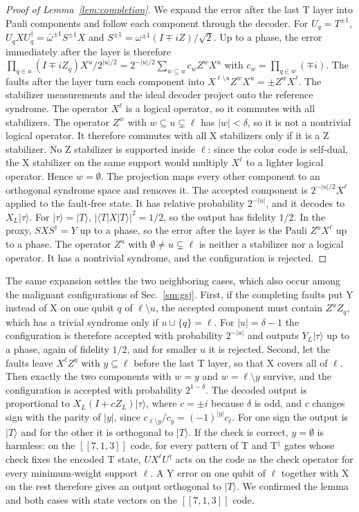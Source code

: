 \documentclass[aps,prl,reprint,twocolumn,amsmath,amssymb,floatfix,nofootinbib,superscriptaddress]{revtex4-2}
\theoremstyle{definition}
\theoremstyle{remark}
\begin{document}
\begin{proof}[Proof of Lemma~\ref{lem:completion}]
We expand the error after the last T layer into Pauli components and follow each component through the decoder. For $U_q=T^{\pm1}$, $U_qXU_q^\dagger=\bar\omega^{\pm1}S^{\pm1}X$ and $S^{\pm1}=\omega^{\pm1}(I\mp iZ)/\sqrt2$. Up to a phase, the error immediately after the layer is therefore $\prod_{q\in u}(I\mp iZ_q)X^u/2^{|u|/2}=2^{-|u|/2}\sum_{w\subseteq u}c_wZ^wX^u$ with $c_w=\prod_{q\in w}(\mp i)$. The faults after the layer turn each component into $X^{\ell\setminus u}Z^wX^u=\pm Z^wX^\ell$. The stabilizer measurements and the ideal decoder project onto the reference syndrome. The operator $X^\ell$ is a logical operator, so it commutes with all stabilizers. The operator $Z^w$ with $w\subseteq u\subsetneq\ell$ has $|w|<\delta$, so it is not a nontrivial logical operator. It therefore commutes with all X stabilizers only if it is a Z stabilizer. No Z stabilizer is supported inside $\ell$: since the color code is self-dual, the X stabilizer on the same support would multiply $X^\ell$ to a lighter logical operator. Hence $w=\emptyset$. The projection maps every other component to an orthogonal syndrome space and removes it. The accepted component is $2^{-|u|/2}X^\ell$ applied to the fault-free state. It has relative probability $2^{-|u|}$, and it decodes to $X_L|\tau\rangle$. For $|\tau\rangle=|T\rangle$, $|\langle T|X|T\rangle|^2=1/2$, so the output has fidelity $1/2$. In the proxy, $SXS^\dagger=Y$ up to a phase, so the error after the layer is the Pauli $Z^uX^\ell$ up to a phase. The operator $Z^u$ with $\emptyset\neq u\subsetneq\ell$ is neither a stabilizer nor a logical operator. It has a nontrivial syndrome, and the configuration is rejected.
\end{proof}
The same expansion settles the two neighboring cases, which also occur among the malignant configurations of Sec.~\ref{sm:gsj}. First, if the completing faults put Y instead of X on one qubit $q$ of $\ell\setminus u$, the accepted component must contain $Z^{u}Z_q$, which has a trivial syndrome only if $u\cup\{q\}=\ell$. For $|u|=\delta-1$ the configuration is therefore accepted with probability $2^{-|u|}$ and outputs $Y_L|\tau\rangle$ up to a phase, again of fidelity $1/2$, and for smaller $u$ it is rejected. Second, let the faults leave $X^\ell Z^y$ with $y\subseteq\ell$ before the last T layer, so that X covers all of $\ell$. Then exactly the two components with $w=y$ and $w=\ell\setminus y$ survive, and the configuration is accepted with probability $2^{1-\delta}$. The decoded output is proportional to $X_L(I+cZ_L)|\tau\rangle$, where $c=\pm i$ because $\delta$ is odd, and $c$ changes sign with the parity of $|y|$, since $c_{\ell\setminus y}/c_y=(-1)^{|y|}c_\ell$. For one sign the output is $|T\rangle$ and for the other it is orthogonal to $|T\rangle$. If the check is correct, $y=\emptyset$ is harmless: on the $[[7,1,3]]$ code, for every pattern of T and T$^\dagger$ gates whose check fixes the encoded T state, $UX^\ell U^\dagger$ acts on the code as the check operator for every minimum-weight support $\ell$. A Y error on one qubit of $\ell$ together with X on the rest therefore gives an output orthogonal to $|T\rangle$. We confirmed the lemma and both cases with state vectors on the $[[7,1,3]]$ code.
\end{document}
